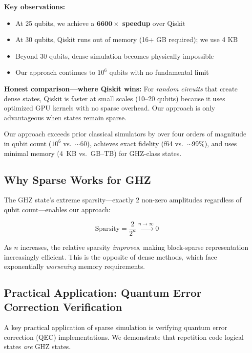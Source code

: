\documentclass[11pt,twocolumn]{article}
\begin{document}
\textbf{Key observations:}
\begin{itemize}
    \item At 25 qubits, we achieve a $\mathbf{6600\times}$ \textbf{speedup} over Qiskit
    \item At 30 qubits, Qiskit runs out of memory (16+ GB required); we use 4 KB
    \item Beyond 30 qubits, dense simulation becomes physically impossible
    \item Our approach continues to $10^6$ qubits with no fundamental limit
\end{itemize}

\textbf{Honest comparison---where Qiskit wins:} For \emph{random circuits} that create dense states, Qiskit is faster at small scales (10--20 qubits) because it uses optimized GPU kernels with no sparse overhead. Our approach is only advantageous when states remain sparse.

Our approach exceeds prior classical simulators by over four orders of magnitude in qubit count ($10^6$ vs.\ $\sim$60), achieves exact fidelity (f64 vs.\ $\sim$99\%), and uses minimal memory (4~KB vs.\ GB--TB) for GHZ-class states.

\subsection{Why Sparse Works for GHZ}

The GHZ state's extreme sparsity---exactly 2 non-zero amplitudes regardless of qubit count---enables our approach:

\begin{equation}
    \text{Sparsity} = \frac{2}{2^n} \xrightarrow{n \to \infty} 0
\end{equation}

As $n$ increases, the relative sparsity \emph{improves}, making block-sparse representation increasingly efficient. This is the opposite of dense methods, which face exponentially \emph{worsening} memory requirements.

\subsection{Practical Application: Quantum Error Correction Verification}

A key practical application of sparse simulation is verifying quantum error correction (QEC) implementations. We demonstrate that repetition code logical states \emph{are} GHZ states.
\end{document}

